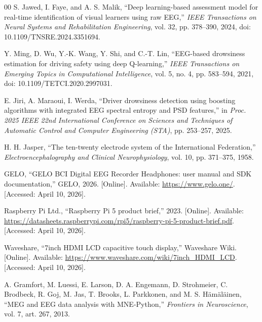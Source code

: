 \begin{thebibliography}{00}
S. Jawed, I. Faye, and A. S. Malik, ``Deep learning-based assessment model for
real-time identification of visual learners using raw EEG,'' \textit{IEEE
Transactions on Neural Systems and Rehabilitation Engineering}, vol. 32,
pp. 378--390, 2024, doi: 10.1109/TNSRE.2024.3351694.

Y. Ming, D. Wu, Y.-K. Wang, Y. Shi, and C.-T. Lin, ``EEG-based drowsiness
estimation for driving safety using deep Q-learning,'' \textit{IEEE Transactions
on Emerging Topics in Computational Intelligence}, vol. 5, no. 4, pp. 583--594,
2021, doi: 10.1109/TETCI.2020.2997031.

E. Jiri, A. Maraoui, I. Werda, ``Driver drowsiness detection using boosting
algorithms with integrated EEG spectral entropy and PSD features,'' in
\textit{Proc. 2025 IEEE 22nd International Conference on Sciences and Techniques
of Automatic Control and Computer Engineering (STA)}, pp. 253--257, 2025.


H. H. Jasper, ``The ten-twenty electrode system of the International Federation,''
\textit{Electroencephalography and Clinical Neurophysiology}, vol. 10,
pp. 371--375, 1958.

GELO, ``GELO BCI Digital EEG Recorder Headphones: user manual and SDK
documentation,'' GELO, 2026. [Online]. Available: \url{https://www.gelo.one/}.
[Accessed: April 10, 2026].

Raspberry Pi Ltd., ``Raspberry Pi 5 product brief,'' 2023. [Online]. Available:
\url{https://datasheets.raspberrypi.com/rpi5/raspberry-pi-5-product-brief.pdf}.
[Accessed: April 10, 2026].

Waveshare, ``7inch HDMI LCD capacitive touch display,'' Waveshare Wiki. [Online].
Available: \url{https://www.waveshare.com/wiki/7inch_HDMI_LCD}.
[Accessed: April 10, 2026].

A. Gramfort, M. Luessi, E. Larson, D. A. Engemann, D. Strohmeier, C. Brodbeck,
R. Goj, M. Jas, T. Brooks, L. Parkkonen, and M. S. H\"{a}m\"{a}l\"{a}inen,
``MEG and EEG data analysis with MNE-Python,'' \textit{Frontiers in Neuroscience},
vol. 7, art. 267, 2013.


\end{thebibliography}
